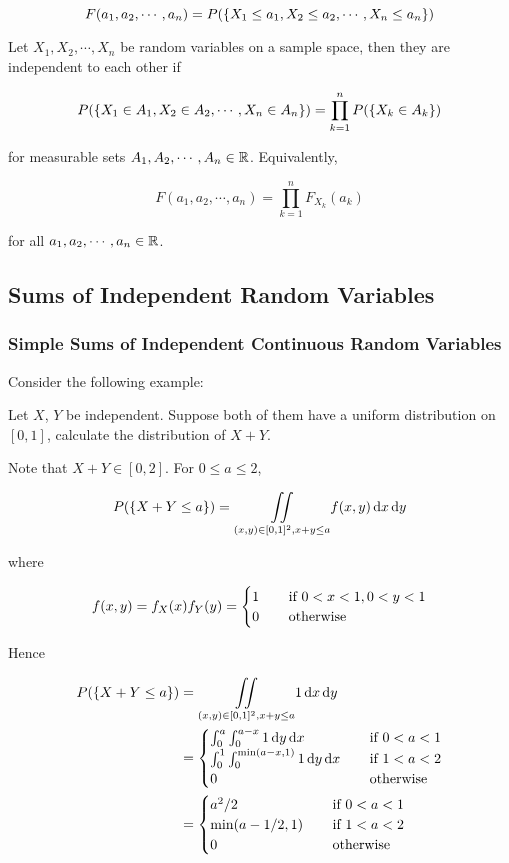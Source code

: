 \documentclass[a4paper,12pt]{article}
\begin{document}
$$F(a_{1},a_{2},\cdots,a_{n})=P(\left\{ X_{1}\leq a_{1},X_{2}\leq a_{2},\cdots,X_{n}\leq a_{n}\right\})$$\s

\begin{thm}
  Let $X_{1},X_{2},\cdots,X_{n}$ be random variables on a sample space, then they are independent to each other if

  $$P(\left\{ X_{1}\in A_{1},X_{2}\in A_{2},\cdots,X_{n}\in A_{n}\right\})=\prod_{k=1}^{n}P(\left\{ X_{k}\in A_{k}\right\})$$\s

  for measurable sets $A_{1},A_{2},\cdots,A_{n}\in\mathbb{R}$. Equivalently,

  $$F(a_{1},a_{2},\cdots,a_{n})=\prod_{k=1}^{n}F_{X_{k}}(a_{k})$$\s

  for all $a_{1},a_{2},\cdots,a_{n}\in\mathbb{R}$.
\end{thm}

\subsection{Sums of Independent Random Variables}
\subsubsection{Simple Sums of Independent Continuous Random Variables}
Consider the following example:\n

\begin{exm}
  Let $X$, $Y$ be independent. Suppose both of them have a uniform distribution on $[0,1]$, calculate the distribution of $X+Y$.\n

  \ans Note that $X+Y\in[0,2]$. For $0\leq a\leq 2$,

  $$P(\left\{ X+Y\leq a\right\})=\underset{(x,y)\in[0,1]^{2},x+y\leq a}{\iint}f(x,y)\,\mathrm{d} x\,\mathrm{d} y$$\s

  where

  $$f(x,y)=f_{X}(x)f_{Y}(y)=\begin{cases}
    1&\;\;\;\;\text{if }0<x<1,0<y<1\\
    0&\;\;\;\;\text{otherwise}
  \end{cases}$$\s

  Hence

  $$\begin{aligned}[t]
    P(\left\{ X+Y\leq a\right\})&=\underset{(x,y)\in[0,1]^{2},x+y\leq a}{\iint}1\,\mathrm{d} x\,\mathrm{d} y\\
    &=\begin{cases}
      \int_{0}^{a}\int_{0}^{a-x}1\,\mathrm{d} y\,\mathrm{d} x&\;\;\;\;\text{if }0<a<1\\
      \int_{0}^{1}\int_{0}^{\min(a-x,1)}1\,\mathrm{d} y\,\mathrm{d} x&\;\;\;\;\text{if }1<a<2\\
      0&\;\;\;\;\text{otherwise}
    \end{cases}\\
    &=\begin{cases}
      a^{2}/2&\;\;\;\;\text{if }0<a<1\\
      \min(a-1/2,1)&\;\;\;\;\text{if }1<a<2\\
      0&\;\;\;\;\text{otherwise}
    \end{cases}
  \end{aligned}$$
\end{exm}\n
\end{document}
